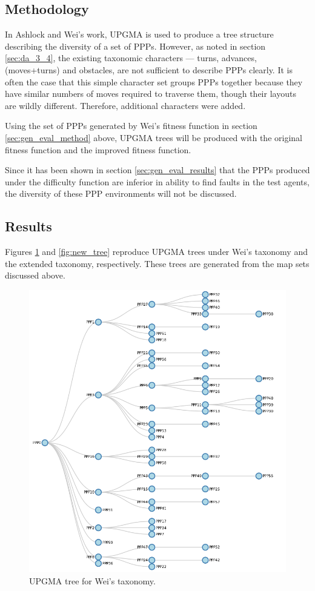 \documentclass[authoryearcitations]{UoYCSproject}
\begin{document}
\subsection{Methodology}
\label{sec:div_eval_method}
In Ashlock and Wei's work, UPGMA is used to produce a tree structure describing the diversity of a set of PPPs. However, as noted in section \ref{sec:da_3_4}, the existing taxonomic characters --- turns, advances, (moves+turns) and obstacles, are not sufficient to describe PPPs clearly. It is often the case that this simple character set groups PPPs together because they have similar numbers of moves required to traverse them, though their layouts are wildly different. Therefore, additional characters were added.

Using the set of PPPs generated by Wei's fitness function in section \ref{sec:gen_eval_method} above, UPGMA trees will be produced with the original fitness function and the improved fitness function.

Since it has been shown in section \ref{sec:gen_eval_results} that the PPPs produced under the difficulty function are inferior in ability to find faults in the test agents, the diversity of these PPP environments will not be discussed.

\subsection{Results}
\label{sec:div_eval_res}
Figures \ref{fig:wei_tree} and \ref{fig:new_tree} reproduce UPGMA trees under Wei's taxonomy and the extended taxonomy, respectively. These trees are generated from the map sets discussed above.

\begin{figure}
\graphicspath{ {EvalPics/} }
\includegraphics[scale=0.5]{wei_tree.png}
\caption{UPGMA tree for Wei's taxonomy.}
\label{fig:wei_tree}
\end{figure}
\end{document}
